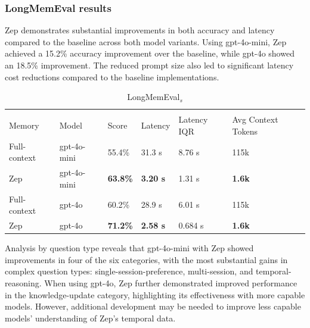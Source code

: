 \documentclass{article}
\begin{document}
\subsubsection{LongMemEval results}

Zep demonstrates substantial improvements in both accuracy and latency compared to the baseline across both model variants. Using gpt-4o-mini, Zep achieved a 15.2\% accuracy improvement over the baseline, while gpt-4o showed an 18.5\% improvement. The reduced prompt size also led to significant latency cost reductions compared to the baseline implementations.

\begin{table}[h]
 \caption{LongMemEval$_{s}$}
  \centering
  \begin{tabular}{llllll}
    \toprule
    \multicolumn{2}{c}{}                  \\
    Memory     & Model     & Score  & Latency & Latency IQR  & Avg Context Tokens \\
    \midrule
    Full-context & gpt-4o-mini & 55.4\% & 31.3 s & 8.76 s & 115k\\
    Zep & gpt-4o-mini & \textbf{63.8\%} & \textbf{3.20 s} & 1.31 s & \textbf{1.6k} \\
    Full-context & gpt-4o & 60.2\% & 28.9 s & 6.01 s & 115k \\
    Zep & gpt-4o & \textbf{71.2\%} & \textbf{2.58 s} & 0.684 s & \textbf{1.6k}\\
    \bottomrule
  \end{tabular}
  \label{tab:lmeoverview}
\end{table}



Analysis by question type reveals that gpt-4o-mini with Zep showed improvements in four of the six categories, with the most substantial gains in complex question types: single-session-preference, multi-session, and temporal-reasoning. When using gpt-4o, Zep further demonstrated improved performance in the knowledge-update category, highlighting its effectiveness with more capable models. However, additional development may be needed to improve less capable models' understanding of Zep's temporal data.
\end{document}
